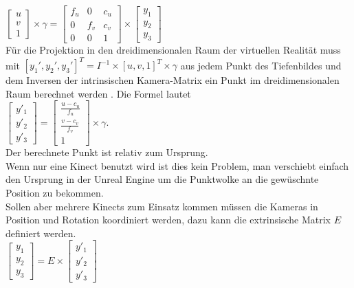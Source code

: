 \documentclass[a4paper]{IEEEtran}
\begin{document}
$\begin{bmatrix}
u \\
v \\
1
\end{bmatrix}
\times
\gamma
= \begin{bmatrix}
f_u & 0 & c_u  \\
0 & f_v & c_v  \\
0 & 0 & 1  
\end{bmatrix}
\times
\begin{bmatrix}
y_1 \\
y_2 \\
y_3
\end{bmatrix}$\\[1cm]

	Für die Projektion in den dreidimensionalen Raum der virtuellen Realität muss mit $[y_1',y_2',y_3']^T = I^{-1} \times [u,v,1]^T \times \gamma$ aus jedem Punkt des Tiefenbildes und dem Inversen der intrinsischen Kamera-Matrix ein Punkt im dreidimensionalen Raum berechnet werden \cite{TEO}.
	Die Formel lautet \\[1cm]

$\begin{bmatrix}
y'_1 \\
y'_2 \\
y'_3
\end{bmatrix}
= \begin{bmatrix}
\frac{u - c_u}{f_u} \\
\frac{v - c_v}{f_v}  \\
1  
\end{bmatrix}
\times
\gamma$.\\[1cm]

	Der berechnete Punkt ist relativ zum Ursprung. \\
	Wenn nur eine Kinect benutzt wird ist dies kein Problem, man verschiebt einfach den Ursprung in der Unreal Engine um die Punktwolke an die gewüschnte Position zu bekommen. \\
	Sollen aber mehrere Kinects zum Einsatz kommen müssen die Kameras in Position und Rotation koordiniert werden, dazu kann die extrinsische Matrix $E$ definiert werden. \\[1cm]

$\begin{bmatrix}
y_1 \\
y_2 \\
y_3
\end{bmatrix}
= E
\times
\begin{bmatrix}
y'_1 \\
y'_2 \\
y'_3
\end{bmatrix}$\\[1cm]
\end{document}
